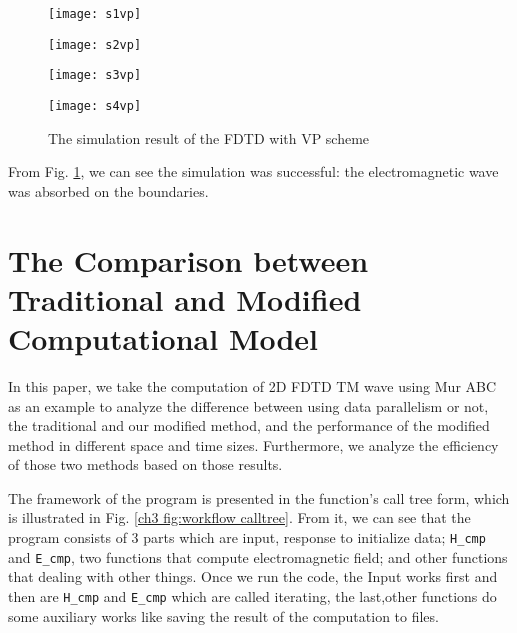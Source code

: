 \begin{figure}
	\centering
	\begin{minipage}{0.47\textwidth}
		\centering
		\texttt{[image: s1vp]}
	\end{minipage}
	\begin{minipage}{0.47\textwidth}
		\centering
		\texttt{[image: s2vp]}
	\end{minipage}
	\newline
	\begin{minipage}{0.47\textwidth}
		\centering
		\texttt{[image: s3vp]}
	\end{minipage}
	\begin{minipage}{0.47\textwidth}
		\centering
		\texttt{[image: s4vp]}
	\end{minipage}
	\centering
	\caption{The simulation result of the FDTD with VP scheme}
	\label{ch3 fig:svp}
\end{figure}

From Fig. \ref{ch3 fig:svp}, we can see the simulation was successful: the electromagnetic wave was absorbed on the boundaries.

\section{The Comparison between Traditional and Modified Computational Model}

In this paper, we take the computation of 2D FDTD TM wave using Mur ABC as an example to analyze the difference between using data parallelism or not, the traditional and our modified method, and the performance of the modified method in different space and time sizes. Furthermore, we analyze the efficiency of those two methods based on those results.

The framework of the program is presented in the function’s call tree form, which is illustrated in Fig. \ref{ch3 fig:workflow calltree}. From it, we can see that the program consists of 3 parts which are input, response to initialize data; \lstinline|H_cmp| and \lstinline|E_cmp|, two functions that compute electromagnetic field; and other functions that dealing with other things. Once we run the code, the Input works first and then are \lstinline|H_cmp| and \lstinline|E_cmp| which are called iterating, the last,other functions do some auxiliary works like saving the result of the computation to files.

